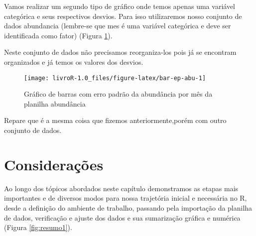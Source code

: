 \documentclass[14pt,titlepage, oneside, openany, a4paper]{book}
\newenvironment{Shaded}{\begin{snugshade}}{\end{snugshade}}
\newcommand{\DataTypeTok}[1]{\textcolor[rgb]{0.13,0.29,0.53}{#1}}
\newcommand{\DecValTok}[1]{\textcolor[rgb]{0.00,0.00,0.81}{#1}}
\newcommand{\KeywordTok}[1]{\textcolor[rgb]{0.13,0.29,0.53}{\textbf{#1}}}
\newcommand{\NormalTok}[1]{#1}
\newcommand{\OperatorTok}[1]{\textcolor[rgb]{0.81,0.36,0.00}{\textbf{#1}}}
\newcommand{\StringTok}[1]{\textcolor[rgb]{0.31,0.60,0.02}{#1}}
\begin{document}
Vamos realizar um segundo tipo de gráfico onde temos apenas uma variável categórica e seus respectivos desvios. Para isso utilizaremos nosso conjunto de dados abundancia (lembre-se que mes é uma variável categórica e deve ser identificada como fator) (Figura \ref{fig:bar-ep-abu}).

Neste conjunto de dados não precisamos reorganiza-los pois já se encontram organizados e já temos os valores dos desvios.

\begin{Shaded}
\end{Shaded}

\begin{figure}[H]

{\centering \texttt{[image: livroR-1.0\_files/figure-latex/bar-ep-abu-1]} 

}

\caption{Gráfico de barras com erro padrão da abundância por mês da planilha abundância}\label{fig:bar-ep-abu}
\end{figure}

Repare que é a mesma coisa que fizemos anteriormente,porém com outro conjunto de dados.

\hypertarget{considerauxe7uxf5es}{%
\section{Considerações}\label{considerauxe7uxf5es}}

Ao longo dos tópicos abordados neste capítulo demonstramos as etapas mais importantes e de diversos modos para nossa trajetória inicial e necessária no R, desde a definição do ambiente de trabalho, passando pela importação da planilha de dados, verificação e ajuste dos dados e sua sumarização gráfica e numérica (Figura \ref{fig:resumo1}).
\end{document}
